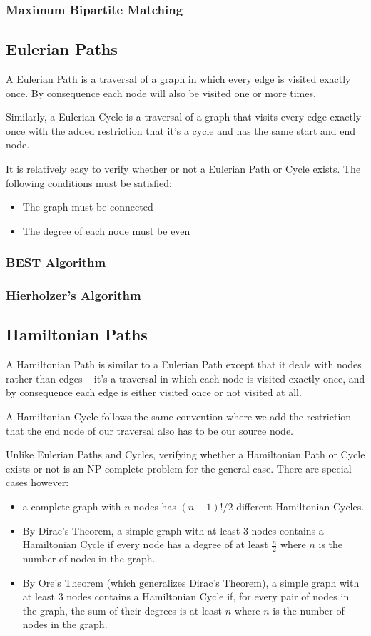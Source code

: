 \subsubsection{Maximum Bipartite Matching}
\subsection{Eulerian Paths}

A Eulerian Path is a traversal of a graph in which every edge is visited exactly once. By consequence each node will also be visited one or more times.

Similarly, a Eulerian Cycle is a traversal of a graph that visits every edge exactly once with the added restriction that it's a cycle and has the same start and end node.

It is relatively easy to verify whether or not a Eulerian Path or Cycle exists. The following conditions must be satisfied:
\begin{itemize}
\item The graph must be connected
\item The degree of each node must be even
\end{itemize}

\subsubsection{BEST Algorithm}
\subsubsection{Hierholzer's Algorithm}
\subsection{Hamiltonian Paths}

A Hamiltonian Path is similar to a Eulerian Path except that it deals with nodes rather than edges -- it's a traversal in which each node is visited exactly once, and by consequence each edge is either visited once or not visited at all.

A Hamiltonian Cycle follows the same convention where we add the restriction that the end node of our traversal also has to be our source node.

Unlike Eulerian Paths and Cycles, verifying whether a Hamiltonian Path or Cycle exists or not is an NP-complete problem for the general case. There are special cases however:
\begin{itemize}
\item a complete graph with $n$ nodes has $(n-1)!/2$ different Hamiltonian Cycles.
\item By Dirac's Theorem, a simple graph with at least 3 nodes contains a Hamiltonian Cycle if every node has a degree of at least $\frac{n}{2}$ where $n$ is the number of nodes in the graph.
\item By Ore's Theorem (which generalizes Dirac's Theorem), a simple graph with at least 3 nodes contains a Hamiltonian Cycle if, for every pair of nodes in the graph, the sum of their degrees is at least $n$ where $n$ is the number of nodes in the graph.
\end{itemize}